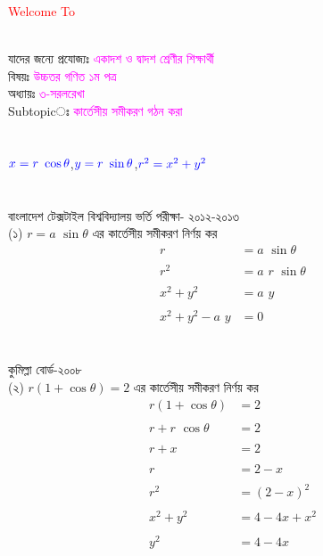 \documentclass{article}
\begin{document}
 
	\Large
	\textcolor{red}{Welcome To} 
	\\
	\\
	যাদের জন্যে প্রযোজ্যঃ  	\textcolor{magenta}{একাদশ ও দ্বাদশ শ্রেণীর শিক্ষার্থী} \\
	বিষয়ঃ \textcolor{magenta}{উচ্চতর গণিত ১ম পত্র} \\
	অধ্যায়ঃ \textcolor{magenta}{৩-সরলরেখা}\\ 
	Subtopicঃ  \textcolor{magenta}{ কার্তেসীয় সমীকরণ গঠন  করা }\\
	\\
	\\
	$\textcolor{blue}{x=r\,\,\cos \theta}$,\quad $\textcolor{blue}{y=r\,\,\sin \theta}$,\quad $\textcolor{blue}{r^2=x^2+y^2}$ \\
	\\
	\vspace{2cm}
	\\
	বাংলাদেশ টেক্সটাইল বিশ্ববিদ্যালয় ভর্তি পরীক্ষা- ২০১২-২০১৩\\
	(১)  $r=a\,\,\sin \theta$ এর কার্তেসীয় সমীকরণ নির্ণয় কর 
	\begin{align*}
		r&=a\,\,\sin \theta\\
		\\
		r^2&=a\,\,r\,\,\sin \theta\\
		\\
		x^2+y^2&=a \,\,y\\
		\\
		x^2+y^2-a\,\,y&=0
	\end{align*}
\\
\vspace{3cm}
\\
কুমিল্লা বোর্ড-২০০৮\\
(২)  $r(1+\cos \theta)=2$ এর কার্তেসীয় সমীকরণ নির্ণয় কর\\ 
\begin{align*}
	r(1+\cos \theta)&=2\\
	\\
	r+r\,\,\cos \theta&=2\\
	\\
	r+x&=2\\
	\\
	r&=2-x\\
	\\
	r^2&=(2-x)^2\\
	\\
	x^2+y^2&=4-4x+x^2\\
	\\
	y^2&=4-4x
\end{align*}
\end{document}
